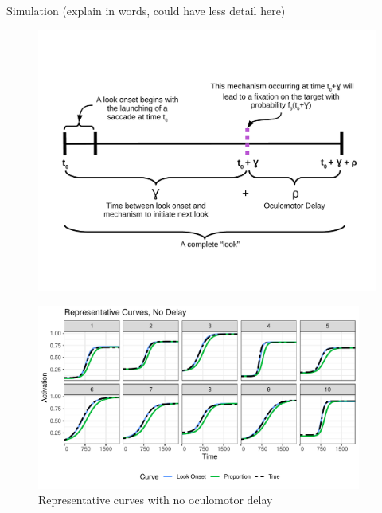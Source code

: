 \documentclass{beamer}
\newcommand{\vp}{\vspace{2mm}}
\begin{document}
\begin{frame}{Simulation (explain in words, could have less detail here)}

\vspace{-2.5mm}
\begin{figure}
\centering
\includegraphics[scale=0.4]{look_comp.pdf}
\end{figure}
\end{frame}

%
%
%


\begin{frame}
\begin{figure}[H]
\centering
\includegraphics[width=0.95\textwidth]{rep_curves_no_delay.pdf}
\caption{Representative curves with no oculomotor delay}
\end{figure}
\end{frame}
\end{document}
